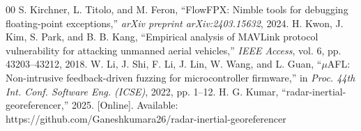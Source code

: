 \documentclass[conference]{IEEEtran}
\begin{document}
\begin{thebibliography}{00}
 S. Kirchner, L. Titolo, and M. Feron, ``FlowFPX: Nimble tools for debugging floating-point exceptions,'' \textit{arXiv preprint arXiv:2403.15632}, 2024.
 H. Kwon, J. Kim, S. Park, and B. B. Kang, ``Empirical analysis of MAVLink protocol vulnerability for attacking unmanned aerial vehicles,'' \textit{IEEE Access}, vol. 6, pp. 43203--43212, 2018.
 W. Li, J. Shi, F. Li, J. Lin, W. Wang, and L. Guan, ``$\mu$AFL: Non-intrusive feedback-driven fuzzing for microcontroller firmware,'' in \textit{Proc. 44th Int. Conf. Software Eng. (ICSE)}, 2022, pp. 1--12.
 H. G. Kumar, ``radar-inertial-georeferencer,'' 2025. [Online]. Available: https://github.com/Ganeshkumara26/radar-inertial-georeferencer
\end{thebibliography}
\end{document}
